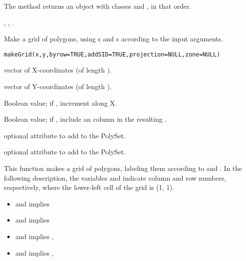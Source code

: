 \documentclass[letterpaper]{book}
\begin{document}
%
\begin{Value}
The  method returns an object with classes
 and , in that order.
\end{Value}
%
\begin{SeeAlso}\relax
{},
,
.
\end{SeeAlso}
%
\begin{Description}\relax
Make a grid of polygons, using s and s according
to the input arguments.
\end{Description}
%
\begin{Usage}
\begin{verbatim}
makeGrid(x,y,byrow=TRUE,addSID=TRUE,projection=NULL,zone=NULL)
\end{verbatim}
\end{Usage}
%
\begin{Arguments}
\begin{ldescription}
\item[\code{x}] vector of X-coordinates (of length ).
\item[\code{y}] vector of Y-coordinates (of length ).
\item[\code{byrow}] Boolean value; if , increment  along X.
\item[\code{addSID}] Boolean value; if , include an  column in
the resulting .
\item[\code{projection}] optional  attribute to add to
the PolySet.
\item[\code{zone}] optional  attribute to add to the PolySet.
\end{ldescription}
\end{Arguments}
%
\begin{Details}\relax
This function makes a grid of polygons, labeling them according to
 and .  In the following description, the
variables  and  indicate column and row numbers,
respectively, where the lower-left cell of the grid is (1, 1).
\begin{itemize}

\item {} \eqn{=}{}  and  \eqn{=}{}
 implies  
\item {} \eqn{=}{}  and  \eqn{=}{}
 implies  
\item {} \eqn{=}{}  and  \eqn{=}{}
 implies  ,  
\item {} \eqn{=}{}  and  \eqn{=}{}
 implies  ,  

\end{itemize}

\end{Details}
\end{document}

